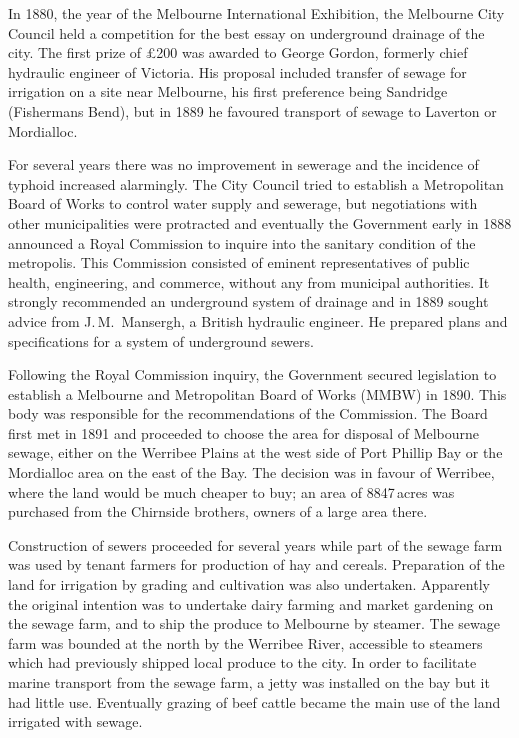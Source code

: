 In 1880, the year of the Melbourne International Exhibition,
 the
Melbourne City Council held a competition for the best essay on
underground drainage of the city.  The first prize of
\pounds200 was awarded to George Gordon,  formerly
chief hydraulic engineer of Victoria.  His proposal included transfer
of sewage for irrigation on a site near Melbourne, his first
preference being Sandridge (Fishermans Bend), but in 1889 he favoured
transport of sewage to Laverton or
Mordialloc.

For several years there was no improvement in sewerage and the
incidence of typhoid increased alarmingly.
The City Council tried to establish a Metropolitan Board of Works to
control water supply and sewerage, but negotiations with other
municipalities were protracted and eventually the Government early in
1888 announced a Royal Commission to inquire into the sanitary
condition of the metro\-po\-lis.  This Commission consisted of eminent
representatives of public health, engineering, and commerce, without
any from municipal authorities.  It strongly recommended an
underground system of drainage and in 1889 sought
advice from J.\,M.~Mansergh,  a British
hydraulic engineer.  He prepared plans and specifications for a system
of underground sewers.

Following the Royal Commission inquiry, the Government secured
legislation to establish a Melbourne and Metropolitan Board of Works
(MMBW)  in 1890.  This
body was responsible for the recommendations of the Commission.  The
Board first met in 1891 and proceeded to choose the area for disposal
of Melbourne sewage, either on the Werribee Plains at the west side of
Port Phillip Bay or the Mordialloc area on the east of the Bay.  The
decision was in favour of Werribee, 
where the land would be much cheaper to buy; an area of 8847\,acres
was purchased from the Chirnside brothers, owners of a large area
there.

Construction of sewers proceeded for several years while part of the
sewage farm was used by tenant farmers for production of
hay and
cereals.  Preparation of the land for irrigation by
grading and cultivation was also undertaken.  Apparently the original
intention was to undertake dairy farming and market
gardening on the sewage farm, and to ship the
produce to Melbourne by steamer. The sewage farm was bounded at the
north by the Werribee River,
 accessible to steamers which had previously
shipped local produce to the city.  In order to facilitate marine
transport from the sewage farm, a jetty was installed on the bay but
it had little use.  Eventually grazing of beef cattle became the main
use of the land irrigated with
sewage.

